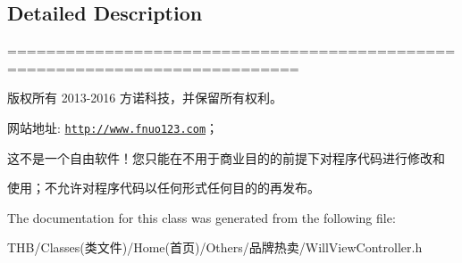 \subsection{Detailed Description}
============================================================================

版权所有 2013-\/2016 方诺科技，并保留所有权利。

网站地址\+: \href{http://www.fnuo123.com}{\tt http\+://www.\+fnuo123.\+com}； 



这不是一个自由软件！您只能在不用于商业目的的前提下对程序代码进行修改和

使用；不允许对程序代码以任何形式任何目的的再发布。 

 

The documentation for this class was generated from the following file\+:\begin{DoxyCompactItemize}
\item 
T\+H\+B/\+Classes(类文件)/\+Home(首页)/\+Others/品牌热卖/Will\+View\+Controller.\+h\end{DoxyCompactItemize}

